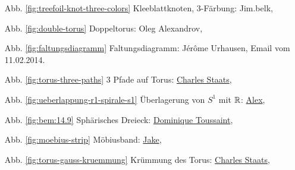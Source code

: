\begin{itemize}
    \item[Abb. \ref{fig:treefoil-knot-three-colors}] Kleeblattknoten, 3-Färbung: Jim.belk, \href{https://commons.wikimedia.org/wiki/File:Tricoloring.png}{}
    \item[Abb. \ref{fig:double-torus}] Doppeltorus: Oleg Alexandrov, \href{https://commons.wikimedia.org/wiki/File:Double_torus_illustration.png}{}
    \item[Abb. \ref{fig:faltungsdiagramm}] Faltungsdiagramm: Jérôme Urhausen, Email vom 11.02.2014.
    \item[Abb. \ref{fig:torus-three-paths}] 3 Pfade auf Torus: \href{http://tex.stackexchange.com/users/484/charles-staats}{Charles Staats}, \href{http://tex.stackexchange.com/a/149991/5645}{}
    \item[Abb. \ref{fig:ueberlappung-r1-spirale-s1}] Überlagerung von $S^1$ mit $\mathbb{R}$: \href{http://tex.stackexchange.com/users/22467/alex}{Alex}, \href{http://tex.stackexchange.com/a/149706/5645}{}
    \item[Abb. \ref{fig:bem:14.9}] Sphärisches Dreieck: \href{https://commons.wikimedia.org/wiki/User:DemonDeLuxe}{Dominique Toussaint},\\
        \href{https://commons.wikimedia.org/wiki/File:Spherical_triangle_3d_opti.png}{}
    \item[Abb. \ref{fig:moebius-strip}] Möbiusband: \href{http://tex.stackexchange.com/users/2552/jake}{Jake},
        \href{http://tex.stackexchange.com/a/118573/5645}{}
    \item[Abb. \ref{fig:torus-gauss-kruemmung}] Krümmung des Torus: \href{http://tex.stackexchange.com/users/484/charles-staats}{Charles Staats}, \href{http://tex.stackexchange.com/a/149991/5645}{}
\end{itemize}
